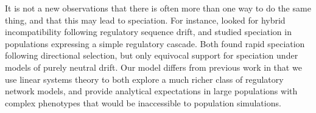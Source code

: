 \documentclass{article}
\newcommand{\jss}[1]{{\color{olive}\it #1}}
\newcommand{\1}{\mathbbm{1}}
\begin{document}
%

It is not a new observations that there is often more than one way to do the same thing,
and that this may lead to speciation.
For instance, \citet{tulchinsky2014hybrid}
looked for hybrid incompatibility
following regulatory sequence drift,
and \citet{porter2002speciation} studied speciation in populations expressing a simple regulatory cascade.
Both found rapid speciation following directional selection,
but only equivocal support for speciation under models of purely neutral drift.
Our model differs from previous work in that we use linear systems theory
to both explore a much richer class of regulatory network models,
and provide analytical expectations in large populations with complex phenotypes
that would be inaccessible to population simulations.
\end{document}
